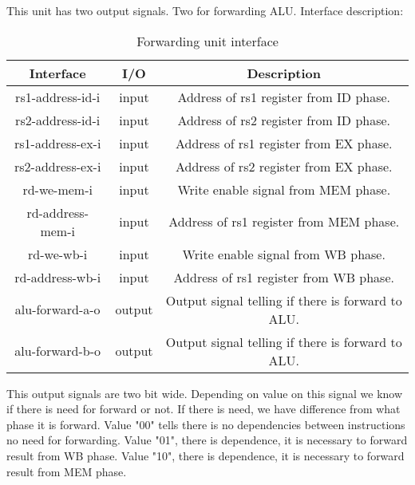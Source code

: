 \documentclass{scrreprt}
\begin{document}
            This unit has two output signals. Two for forwarding ALU. Interface description:
             \begin{table}[htb!]
                \centering
                \begin{tabular}{|c|c|c|} \hline 
             Interface & I/O & Description \\ \hline  
             rs1-address-id-i & input & Address of rs1 register from ID phase. \\ \hline  
             rs2-address-id-i & input & Address of rs2 register from ID phase.  \\ \hline
             rs1-address-ex-i & input & Address of rs1 register from EX phase. \\ \hline
             rs2-address-ex-i & input & Address of rs2 register from EX phase. \\ \hline
             rd-we-mem-i & input & Write enable signal from MEM phase. \\ \hline
             rd-address-mem-i & input & Address of rs1 register from MEM phase. \\ \hline
             rd-we-wb-i & input & Write enable signal from WB phase. \\ \hline
             rd-address-wb-i & input & Address of rs1 register from WB phase. \\ \hline
             alu-forward-a-o & output & Output signal telling if there is forward to ALU. \\ \hline
             alu-forward-b-o & output & Output signal telling if there is forward to ALU. \\ \hline
        \end{tabular}
        \caption{Forwarding unit interface}
        \label{tab:Forwarding}
    \end{table}
        \hfill \break
        This output signals are two bit wide. Depending on value on this signal we know if there is need for forward or not. If there is need, we have difference from what phase it is forward. Value "00" tells there is no dependencies between instructions no need for forwarding. Value "01", there is dependence, it is necessary to forward result from WB phase. Value "10", there is dependence, it is necessary to forward result from MEM phase. 
\end{document}
